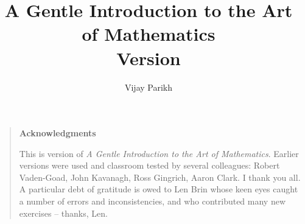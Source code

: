 \documentclass[dvips,12pt,twoside]{book}
\begin{document}
\frontmatter

\title{A Gentle Introduction to the Art of Mathematics\\ {\small Version \versionNum {} }}
\author{Vijay Parikh}
\date{}

\maketitle

\clearpage



\clearpage

\rule{0pt}{0pt}

\vfill

\begin{quote}
{\Large \bf Acknowledgments} 

   This is version \versionNum of {\em A Gentle Introduction to the Art of Mathematics}.
Earlier versions were used and classroom tested by several colleagues: 
Robert Vaden-Goad, John Kavanagh, Ross Gingrich, Aaron Clark.  I thank you all.  
A particular debt of gratitude is owed to Len Brin whose keen eyes caught 
a number of errors and inconsistencies, and who contributed many new 
exercises -- thanks, Len. 
  
\end{quote}

\vfill


\clearpage

\tableofcontents

\listoffigures

\listoftables

%
%

\mainmatter













{}%


%

{}
\printindex
\end{document}

